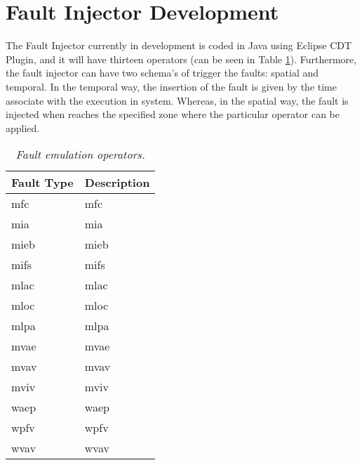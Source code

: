 \newpage
\section{Fault Injector Development}

The Fault Injector currently in development is coded in Java using Eclipse CDT Plugin, and it will have thirteen operators (can be seen in Table \ref{tab:faultEmulationOperators})\cite{duraes2005thesis}. Furthermore, the fault injector can have two schema's of trigger the faults: spatial and temporal. In the temporal way, the insertion of the fault is given by the time associate with the execution in system. Whereas, in the spatial way, the fault is injected when reaches the specified zone where the particular operator can be applied.

\begin{table}[!ht]
\begin{tabular}{|l|p{12cm}|}
\hline
\textbf{Fault Type}		& \multicolumn{1}{c|}{\textbf{Description}}		\\ \hline \hline
\acs{mfc}        				& \Acl{mfc}  									\\ \hline
\acs{mia}        				& \Acl{mia}  									\\ \hline
\acs{mieb}       				& \Acl{mieb} 									\\ \hline
\acs{mifs}       				& \Acl{mifs} 									\\ \hline
\acs{mlac}       				& \Acl{mlac} 									\\ \hline
\acs{mloc}       				& \Acl{mloc} 									\\ \hline
\acs{mlpa}       				& \Acl{mlpa} 									\\ \hline
\acs{mvae}       				& \Acl{mvae} 									\\ \hline
\acs{mvav}       				& \Acl{mvav} 									\\ \hline
\acs{mviv}       				& \Acl{mviv} 									\\ \hline
\acs{waep}       				& \Acl{waep} 									\\ \hline
\acs{wpfv}       				& \Acl{wpfv} 									\\ \hline
\acs{wvav}       				& \Acl{wvav} 									\\ \hline
\end{tabular}
\caption{\small \sl Fault emulation operators.\label{tab:faultEmulationOperators}}
\end{table}

